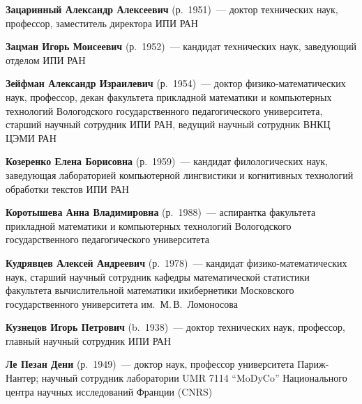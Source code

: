 \begin{multicols}{2}
\vspace*{3pt}

\noindent
\textbf{Зацаринный Александр Алексеевич} (р.\ 1951)~--- доктор технических наук, профессор, заместитель директора 
ИПИ РАН

\vspace*{3pt}

\noindent
\textbf{Зацман Игорь Моисеевич} (р.\ 1952)~--- кандидат технических наук, заведующий отделом ИПИ РАН


\vspace*{3pt}

\noindent
\textbf{Зейфман Александр Израилевич} (р.\ 1954)~--- доктор
физико-математических наук, профессор, декан факультета прикладной
математики и компьютерных технологий Вологодского государственного
педагогического университета, старший научный сотрудник ИПИ РАН,
ведущий научный сотрудник ВНКЦ ЦЭМИ РАН

\vspace*{3pt}

\noindent
\textbf{Козеренко Елена Борисовна} (р.\ 1959)~--- 
кандидат филологических наук, заведующая лабораторией компьютерной лингвистики и 
когнитивных технологий обработки текстов ИПИ РАН

\vspace*{3pt}

\noindent
\textbf{Коротышева Анна Владимировна} (р.\ 1988)~--- аспирантка факультета
прикладной математики и компьютерных технологий Вологодского
государственного педагогического университета

\vspace*{3pt}

\noindent
\textbf{Кудрявцев Алексей Андреевич} (р.\ 1978)~--- кандидат физико-математических наук, 
старший научный сотрудник кафедры математической статистики факультета 
вычислительной математики и\linebreak кибернетики Московского государственного университета им.~М.\,В.~Ломоносова

\vspace*{3pt}

\noindent
\textbf{Кузнецов Игорь Петрович} (b.\ 1938)~--- доктор технических наук, профессор, главный научный сотрудник
ИПИ РАН

\vspace*{3pt}

\noindent
\textbf{Ле Пезан Дени} (р.\ 1949)~--- доктор наук, профессор университета Париж-Нантер; 
научный сотрудник лаборатории UMR 7114 ``MoDyCo'' Национального центра научных исследований Франции (CNRS)


\end{multicols}
